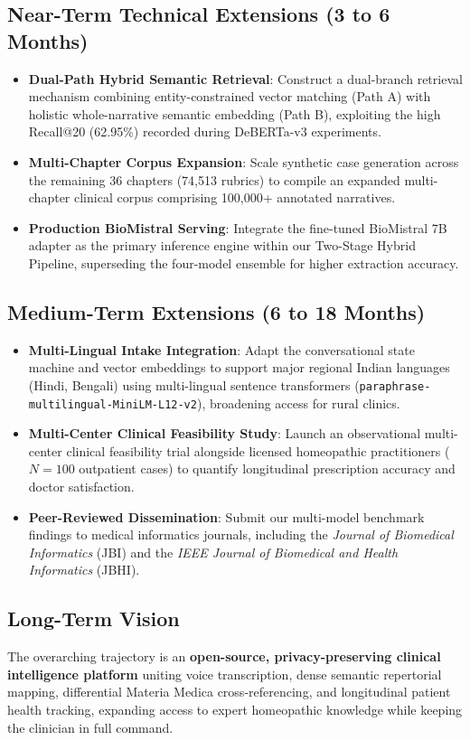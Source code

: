 \subsection{Near-Term Technical Extensions (3 to 6 Months)}
\begin{itemize}
  \item \textbf{Dual-Path Hybrid Semantic Retrieval}: Construct a dual-branch retrieval mechanism combining entity-constrained vector matching (Path A) with holistic whole-narrative semantic embedding (Path B), exploiting the high Recall@20 (62.95\%) recorded during DeBERTa-v3 experiments.
  \item \textbf{Multi-Chapter Corpus Expansion}: Scale synthetic case generation across the remaining 36 chapters (74,513 rubrics) to compile an expanded multi-chapter clinical corpus comprising 100,000+ annotated narratives.
  \item \textbf{Production BioMistral Serving}: Integrate the fine-tuned BioMistral 7B adapter as the primary inference engine within our Two-Stage Hybrid Pipeline, superseding the four-model ensemble for higher extraction accuracy.
\end{itemize}

\subsection{Medium-Term Extensions (6 to 18 Months)}
\begin{itemize}
  \item \textbf{Multi-Lingual Intake Integration}: Adapt the conversational state machine and vector embeddings to support major regional Indian languages (Hindi, Bengali) using multi-lingual sentence transformers (\texttt{paraphrase-multilingual-MiniLM-L12-v2}), broadening access for rural clinics.
  \item \textbf{Multi-Center Clinical Feasibility Study}: Launch an observational multi-center clinical feasibility trial alongside licensed homeopathic practitioners ($N=100$ outpatient cases) to quantify longitudinal prescription accuracy and doctor satisfaction.
  \item \textbf{Peer-Reviewed Dissemination}: Submit our multi-model benchmark findings to medical informatics journals, including the \textit{Journal of Biomedical Informatics} (JBI) and the \textit{IEEE Journal of Biomedical and Health Informatics} (JBHI).
\end{itemize}

\subsection{Long-Term Vision}
The overarching trajectory is an \textbf{open-source, privacy-preserving clinical intelligence platform} uniting voice transcription, dense semantic repertorial mapping, differential Materia Medica cross-referencing, and longitudinal patient health tracking, expanding access to expert homeopathic knowledge while keeping the clinician in full command.


